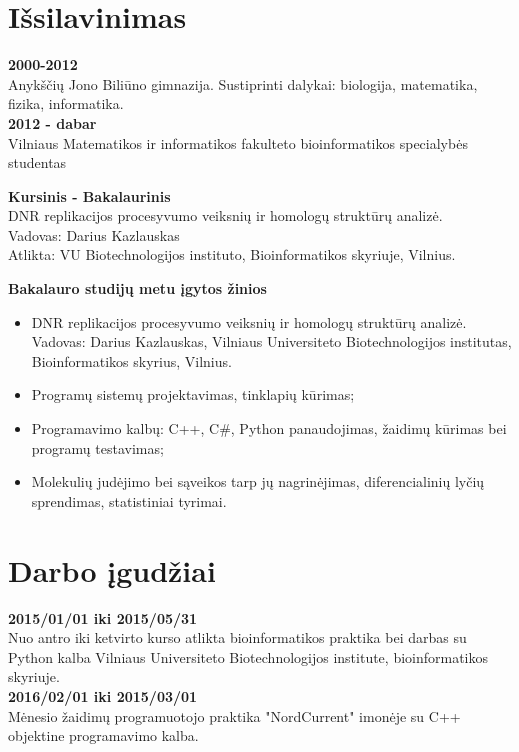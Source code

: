 \documentclass[a4paper,12pt]{article}
\begin{document}
\section{Išsilavinimas}
\textbf{2000-2012} \\
Anykščių Jono Biliūno gimnazija. Sustiprinti dalykai: biologija, matematika, fizika, informatika. \\

\textbf{2012 - dabar} \\ 
Vilniaus Matematikos ir informatikos fakulteto bioinformatikos specialybės studentas

\textbf{Kursinis - Bakalaurinis} \\
DNR replikacijos procesyvumo veiksnių ir homologų struktūrų analizė. \\
Vadovas: Darius Kazlauskas\\
Atlikta: VU Biotechnologijos instituto, Bioinformatikos skyriuje, Vilnius. 

\textbf{Bakalauro studijų metu įgytos žinios}
\begin{itemize}
	\item DNR replikacijos procesyvumo veiksnių ir homologų struktūrų analizė. Vadovas: Darius Kazlauskas, Vilniaus Universiteto Biotechnologijos institutas, Bioinformatikos skyrius, Vilnius. 
	\item Programų sistemų projektavimas, tinklapių kūrimas;
	\item Programavimo kalbų: C++, C\#, Python panaudojimas, žaidimų kūrimas bei programų testavimas;
	\item Molekulių judėjimo bei sąveikos tarp jų nagrinėjimas, diferencialinių lyčių sprendimas, 
statistiniai tyrimai.
\end{itemize}

\clearpage

\vspace{8cm}


\section{Darbo įgudžiai}
\textbf{2015/01/01 iki 2015/05/31} \\
Nuo antro iki ketvirto kurso atlikta bioinformatikos praktika bei darbas su Python kalba Vilniaus Universiteto Biotechnologijos institute, bioinformatikos skyriuje. \\

\vspace{0.5cm}
\textbf{2016/02/01 iki 2015/03/01} \\
Mėnesio žaidimų programuotojo praktika "NordCurrent" imonėje su C++ objektine programavimo kalba.
\vspace{0.5cm}
\end{document}
